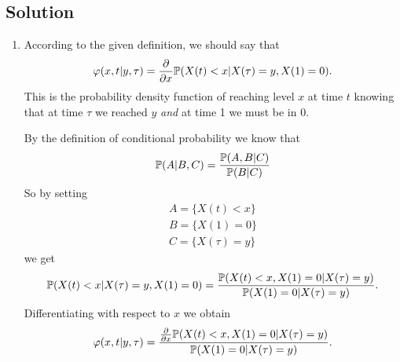 \documentclass[12pt]{article}
\begin{document}
	\subsection*{Solution}
	\begin{enumerate}
		\item According to the given definition, we should say that
		\begin{equation*}
			\varphi(x,t|y,\tau)=\frac{\partial}{\partial x}\mathbb{P}(X(t)<x|X(\tau)=y,X(1)=0).
		\end{equation*}
		This is the probability density function of reaching level $x$ at time $t$ knowing that at time $\tau$ we reached $y$ \textit{and} at time 1 we must be in 0.
		
		By the definition of conditional probability we know that 
		\begin{equation*}
			\mathbb{P}(A|B,C)=\frac{\mathbb{P}(A,B|C)}{\mathbb{P}(B|C)}
		\end{equation*}
		So by setting
		\begin{equation*}
			\begin{array}{c}
				A=\{X(t)<x\}\\
				B=\{X(1)=0\}\\
				C=\{X(\tau)=y\}
			\end{array}
		\end{equation*}
		we get
		\begin{equation*}
			\mathbb{P}(X(t)<x|X(\tau)=y,X(1)=0)=\frac{\mathbb{P}(X(t)<x,X(1)=0|X(\tau)=y)}{\mathbb{P}(X(1)=0|X(\tau)=y)}.
		\end{equation*}
		Differentiating with respect to $x$ we obtain
		\begin{equation*}
			\varphi(x,t|y,\tau)=\frac{\frac{\partial}{\partial x}\mathbb{P}(X(t)<x,X(1)=0|X(\tau)=y)}{\mathbb{P}(X(1)=0|X(\tau)=y)}.
		\end{equation*}

\end{enumerate}
\end{document}
